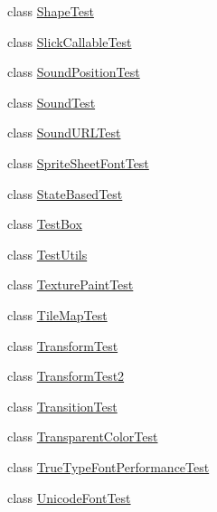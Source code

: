 \begin{DoxyCompactItemize}
\item 
class \mbox{\hyperlink{classorg_1_1newdawn_1_1slick_1_1tests_1_1_shape_test}{Shape\+Test}}
\item 
class \mbox{\hyperlink{classorg_1_1newdawn_1_1slick_1_1tests_1_1_slick_callable_test}{Slick\+Callable\+Test}}
\item 
class \mbox{\hyperlink{classorg_1_1newdawn_1_1slick_1_1tests_1_1_sound_position_test}{Sound\+Position\+Test}}
\item 
class \mbox{\hyperlink{classorg_1_1newdawn_1_1slick_1_1tests_1_1_sound_test}{Sound\+Test}}
\item 
class \mbox{\hyperlink{classorg_1_1newdawn_1_1slick_1_1tests_1_1_sound_u_r_l_test}{Sound\+U\+R\+L\+Test}}
\item 
class \mbox{\hyperlink{classorg_1_1newdawn_1_1slick_1_1tests_1_1_sprite_sheet_font_test}{Sprite\+Sheet\+Font\+Test}}
\item 
class \mbox{\hyperlink{classorg_1_1newdawn_1_1slick_1_1tests_1_1_state_based_test}{State\+Based\+Test}}
\item 
class \mbox{\hyperlink{classorg_1_1newdawn_1_1slick_1_1tests_1_1_test_box}{Test\+Box}}
\item 
class \mbox{\hyperlink{classorg_1_1newdawn_1_1slick_1_1tests_1_1_test_utils}{Test\+Utils}}
\item 
class \mbox{\hyperlink{classorg_1_1newdawn_1_1slick_1_1tests_1_1_texture_paint_test}{Texture\+Paint\+Test}}
\item 
class \mbox{\hyperlink{classorg_1_1newdawn_1_1slick_1_1tests_1_1_tile_map_test}{Tile\+Map\+Test}}
\item 
class \mbox{\hyperlink{classorg_1_1newdawn_1_1slick_1_1tests_1_1_transform_test}{Transform\+Test}}
\item 
class \mbox{\hyperlink{classorg_1_1newdawn_1_1slick_1_1tests_1_1_transform_test2}{Transform\+Test2}}
\item 
class \mbox{\hyperlink{classorg_1_1newdawn_1_1slick_1_1tests_1_1_transition_test}{Transition\+Test}}
\item 
class \mbox{\hyperlink{classorg_1_1newdawn_1_1slick_1_1tests_1_1_transparent_color_test}{Transparent\+Color\+Test}}
\item 
class \mbox{\hyperlink{classorg_1_1newdawn_1_1slick_1_1tests_1_1_true_type_font_performance_test}{True\+Type\+Font\+Performance\+Test}}
\item 
class \mbox{\hyperlink{classorg_1_1newdawn_1_1slick_1_1tests_1_1_unicode_font_test}{Unicode\+Font\+Test}}
\end{DoxyCompactItemize}
